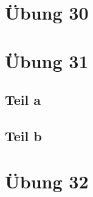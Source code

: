 \documentclass[10pt,a4paper]{article}
\begin{document}
\section*{Übung 30}

\section*{Übung 31}

\subsection*{Teil a}

\subsection*{Teil b}

\section*{Übung 32}
\end{document}
